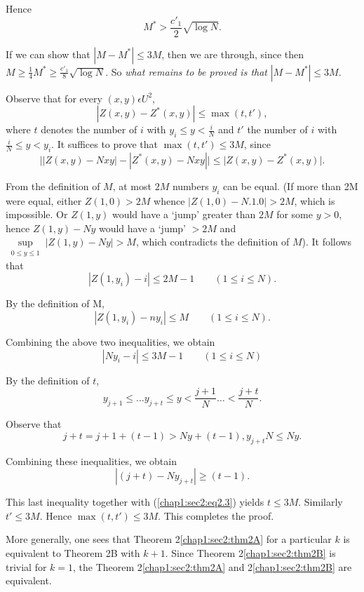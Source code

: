 Hence
$$
M^{*} > \frac{c'_{1}}{2} \sqrt{\log N}.
$$

If we can show that $|M - M^{*}| \leq 3M$, then we are through, since then $M \geq \frac{1}{4} M^{*} \geq \frac{c'_{1}}{8} \sqrt{\log N}$. So {\em what remains to be proved is that} $|M - M^{*}| \leq 3M$.

Observe that for every $(x, y) \epsilon U^{2}$,
$$
|Z(x, y) - Z^{*} (x, y)| \leq \max (t, t'),
$$
where $t$ denotes the number of $i$ with $y_{i} \leq y < \frac{i}{N}$ and $t'$ the number of $i$ with $\frac{i}{N} \leq y < y_{i}$. It suffices to prove that $\max (t, t') \leq 3M$, since
$$
\Big||Z(x, y) - Nxy| - |Z^{*}(x, y) - Nxy|\Big| \leq \big|Z(x, y) - Z^{*}(x, y)\big|.
$$

From the definition of $M$, at most $2M$ numbers $y_{i}$ can be equal. (If more than 2M were equal, either $Z(1, 0) > 2M$ whence $|Z(1, 0) - N. 1.0| > 2M$, which is impossible. Or $Z(1, y)$ would have a `jump' greater than $2M$ for some $y > 0$, hence $Z(1, y) - Ny$ would have a `jump' $> 2M$ and $\displaystyle{\sup\limits_{\substack{0 \leq y \leq 1}}}|Z(1, y) - Ny|> M$, which contradicts the definition of $M$). It follows that
$$
|Z(1, y_{i}) - i| \leq 2M - 1\qquad(1 \leq i \leq N).
$$\pageoriginale

By the definition of M, 
$$
|Z(1, y_{i}) - ny_{i}| \leq M \qquad (1 \leq i \leq N).
$$

Combining the above two inequalities, we obtain
\begin{equation*}
  |Ny_{i} - i| \leq 3M - 1 \qquad (1 \leq i \leq N)\tag{2.3}\label{chap1:sec2:eq2.3}
\end{equation*}

By the definition of $t$,
$$
y_{j+1} \leq \ldots y_{j+t} \leq y < \frac{j+1}{N} \ldots < \frac{j+t}{N}.
$$

Observe that
$$
j+t = j+1+ (t-1) > Ny + (t-1), y_{j+t} N \leq Ny.
$$

Combining these inequalities, we obtain
$$
|(j+t) - Ny_{j+t}| \geq (t-1).
$$

This last inequality together with (\ref{chap1:sec2:eq2.3}) yields $t \leq 3M$. Similarly $t' \leq 3M$. Hence $\max (t, t') \leq 3M$. This completes the proof.

More generally, one sees that Theorem 2\ref{chap1:sec2:thm2A} for a particular $k$ is equivalent to Theorem 2B with $k+1$. Since Theorem 2\ref{chap1:sec2:thm2B} is trivial for $k=1$, the Theorem 2\ref{chap1:sec2:thm2A} and 2\ref{chap1:sec2:thm2B} are equivalent. 

